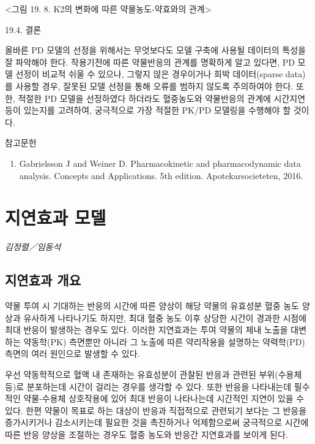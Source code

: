 \documentclass[
  10pt,
]{krantz}
\providecommand{\tightlist}{%
  \setlength{\itemsep}{0pt}\setlength{\parskip}{0pt}}
\begin{document}
\textless 그림 19. 8. K2의 변화에 따른 약물농도-약효와의 관계\textgreater{}

19.4. 결론

올바른 PD 모델의 선정을 위해서는 무엇보다도 모델 구축에 사용될 데이터의 특성을 잘 파악해야 한다. 작용기전에 따른 약물반응의
관계를 명확하게 알고 있다면, PD 모델 선정이 비교적 쉬울 수 있으나, 그렇지 않은 경우이거나 희박 데이터(sparse
data)를 사용할 경우, 잘못된 모델 선정을 통해 오류를 범하지 않도록 주의하여야 한다. 또한, 적절한 PD 모델을 선정하였다
하더라도 혈중농도와 약물반응의 관계에 시간지연 등이 있는지를 고려하여, 궁극적으로 가장 적절한 PK/PD 모델링을 수행해야 할
것이다.

참고문헌

\begin{enumerate}
\def\labelenumi{\arabic{enumi}.}
\tightlist
\item
  Gabrielsson J and Weiner D. Pharmacokinetic and pharmacodynamic data
  analysis. Concepts and Applications. 5th edition.
  Apotekarsocieteten, 2016.
\end{enumerate}

\hypertarget{uxc9c0uxc5f0uxd6a8uxacfc-uxbaa8uxb378}{%
\chapter{지연효과 모델}\label{uxc9c0uxc5f0uxd6a8uxacfc-uxbaa8uxb378}}

\emph{김정렬／임동석}

\hypertarget{uxc9c0uxc5f0uxd6a8uxacfc-uxac1cuxc694}{%
\section{지연효과 개요}\label{uxc9c0uxc5f0uxd6a8uxacfc-uxac1cuxc694}}

약물 투여 시 기대하는 반응의 시간에 따른 양상이 해당 약물의 유효성분 혈중 농도 양상과 유사하게 나타나기도 하지만, 최대 혈중
농도 이후 상당한 시간이 경과한 시점에 최대 반응이 발생하는 경우도 있다. 이러한 지연효과는 투여 약물의 체내 노출을 대변하는
약동학(PK) 측면뿐만 아니라 그 노출에 따른 약리작용을 설명하는 약력학(PD) 측면의 여러 원인으로 발생할 수 있다.

우선 약동학적으로 혈액 내 존재하는 유효성분이 관찰된 반응과 관련된 부위(수용체 등)로 분포하는데 시간이 걸리는 경우를 생각할 수
있다. 또한 반응을 나타내는데 필수적인 약물-수용체 상호작용에 있어 최대 반응이 나타나는데 시간적인 지연이 있을 수 있다. 한편
약물이 목표로 하는 대상이 반응과 직접적으로 관련되기 보다는 그 반응을 증가시키거나 감소시키는데 필요한 것을 촉진하거나
억제함으로써 궁극적으로 시간에 따른 반응 양상을 조절하는 경우도 혈중 농도와 반응간 지연효과를 보이게 된다.
\end{document}
